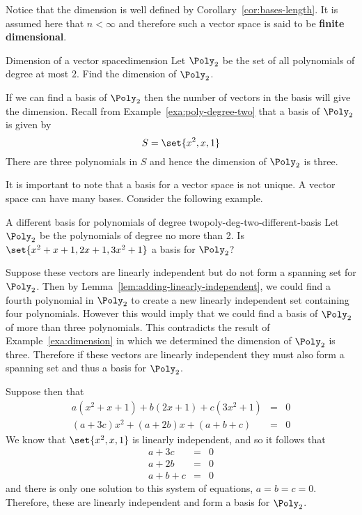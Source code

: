 Notice that the dimension is well defined by Corollary~\ref{cor:bases-length}. It is assumed here
that $n<\infty $ and therefore such a vector space is said to be \textbf{finite
dimensional}.

\begin{example}{Dimension of a vector space}{dimension}
Let $\Poly_2$ be the set of all polynomials of degree at most $2$. Find the dimension of $\Poly_2$. 
\end{example}

\begin{solution}
If we can find a basis of $\Poly_2$ then the number of vectors in the basis will give the dimension. Recall from Example~\ref{exa:poly-degree-two} that a basis of $\Poly_2$ is given by 
\[
S  = \set{x^2, x, 1 }
\]
There are three polynomials in $S$ and hence the dimension of $\Poly_2$ is three. 
\end{solution}

It is important to note that a basis for a vector space is not unique. A vector space can have many bases. Consider the following example.

\begin{example}{A different basis for polynomials of degree two}{poly-deg-two-different-basis}
Let $\Poly_2$ be the polynomials of degree no more than 2. Is $\set{
x^{2}+x+1,2x+1,3x^{2}+1} $ a basis for $\Poly_2$?
\end{example}

\begin{solution}
Suppose these vectors are linearly independent but do not form a spanning set for $\Poly_2$. Then by Lemma~\ref{lem:adding-linearly-independent}, we could find a fourth polynomial in $\Poly_2$ to create a new linearly independent 
set containing four polynomials. However this would imply that we could find a basis of $\Poly_2$ of more than three polynomials. This contradicts the result of Example~\ref{exa:dimension} in which we determined the dimension of $\Poly_2$ is three.  Therefore if these vectors are linearly independent they must also form a spanning set and thus a basis for $\Poly_2$. 

Suppose then that 
\begin{eqnarray*}
a(x^{2}+x+1) +b(2x+1) +c(3x^{2}+1) &=& 0\\
(a+3c) x^{2}+(a+2b) x+(a+b+c) &=& 0 
\end{eqnarray*}
We know that $\set{x^2, x, 1 }$ is linearly independent, and so it follows that  
\begin{eqnarray*}
a+3c &=& 0 \\
a+2b &=& 0 \\
a+b+c &=& 0
\end{eqnarray*}
and there is only one solution to this system of equations, $a=b=c=0$.
Therefore, these are linearly independent and form a basis for $\Poly_2$.
\end{solution}

